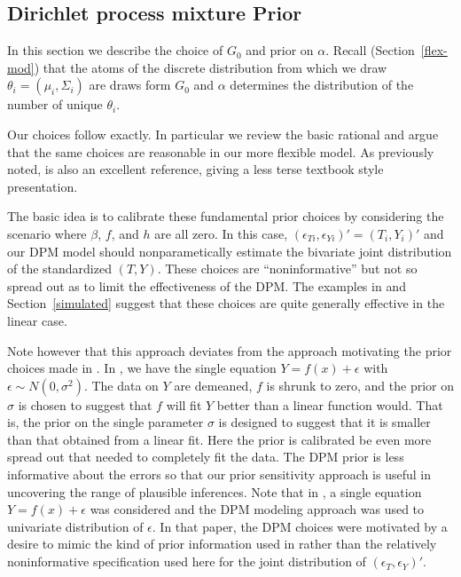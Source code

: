 \subsection{Dirichlet process mixture Prior}\label{subsec:DPM-prior}

In this section we describe the choice of $G_0$ and prior on $\alpha$.
Recall (Section~\ref{flex-mod}) that the atoms of the discrete distribution from which we draw $\theta_i = (\mu_i,\Sigma_i)$ are draws
form $G_0$ and $\alpha$ determines the distribution of the number of unique $\theta_i$.

Our choices follow \citep{CHMR08} exactly.  
In particular we review the basic rational and argue that the same choices are reasonable in our more flexible model.
As previously noted, \citep{ROSSI14} is also an excellent reference, giving a less terse textbook style presentation.

The basic idea is to calibrate these fundamental prior choices by considering the scenario where $\beta$, $f$, and $h$ are all zero.
In this case, $(\epsilon_{Ti},\epsilon_{Yi})' = (T_i,Y_i)'$ and 
our DPM model should nonparametically estimate the 
bivariate joint distribution of the standardized $(T,Y)$.  
These choices are ``noninformative'' but not so spread out as to limit the effectiveness of the DPM.
The examples in \cite{CHMR08}  and Section~\ref{simulated}
suggest that these choices are quite generally effective in the linear case.

Note however that this approach deviates from the approach motivating the prior choices made in \citep{ChipGeor10}.
In \citep{ChipGeor10}, we have the single equation $Y = f(x) + \epsilon$ with $\epsilon \sim N(0,\sigma^2)$. 
The data on $Y$ are demeaned, $f$ is shrunk to zero, and the prior on $\sigma$ is chosen to suggest that $f$ will fit $Y$ better
than a linear function would.
That is, the prior on the single parameter $\sigma$ is designed to suggest that it is smaller than that obtained from
a linear fit.  Here the prior is calibrated be even more spread out that needed to completely fit the data.
The \cite{CHMR08} DPM prior is less informative about the errors so that our prior sensitivity approach is useful in uncovering
the range of plausible inferences.
Note that in \citep{DPMBART}, a single equation $Y = f(x) + \epsilon$ was considered and the DPM modeling approach was used
to univariate distribution of $\epsilon$.  In that paper, the DPM choices were motivated by a desire to mimic the kind of prior
information used in \citep{ChipGeor10} rather than the relatively noninformative specification used here for the joint distribution
of $(\epsilon_{T},\epsilon_{Y})'$.

